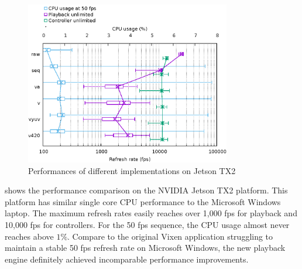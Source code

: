 
\begin{figure}[!t]
  \centering
  \includegraphics[width=0.8\textwidth]{Figs/TX2-perf.eps}
  \caption{\footnotesize Performances of different implementations on Jetson TX2}
  \label{fig:perf-TX2}
\end{figure}

 shows the performance comparison on the NVIDIA Jetson TX2 platform. This platform has similar single core CPU performance to the Microsoft Windows laptop. The maximum refresh rates easily reaches over 1,000 fps for playback and 10,000 fps for controllers. For the 50 fps sequence, the CPU usage almost never reaches above $1 \%$. Compare to the original Vixen application struggling to maintain a stable 50 fps refresh rate on Microsoft Windows, the new playback engine definitely achieved incomparable performance improvements.
